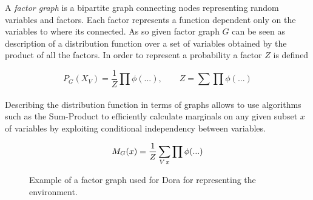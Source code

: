 \documentclass[runningheads,a4paper]{llncs}
\begin{document}
A \emph{factor graph} is a bipartite graph connecting nodes representing random variables and factors.
Each factor represents a function dependent only on the variables to where its connected.
As so given factor graph $G$ can be seen as description of a distribution function over a set
of variables obtained by the product of all the factors. In order to represent a probability
a factor $Z$ is defined

\begin{equation}
P_G(X_V) = \frac{1}{Z}\prod_{}{\phi(...)},\qquad Z = \sum\prod{\phi(...)}
\end{equation}

Describing the distribution function in terms of graphs allows to use algorithms such as the
Sum-Product to efficiently calculate marginals on any given subset $x$ of variables by
exploiting conditional independency between variables.

\begin{equation}
M_G(x) = \frac{1}{Z}\sum_{V \\ x}{\prod{\phi(...)}}
\end{equation}

\begin{figure}[h]
\centering
{}
\caption{Example of a factor graph used for Dora for representing the environment.}
\end{figure}

\end{document}
